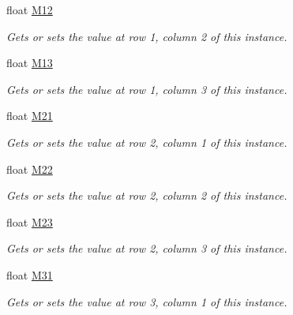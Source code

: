 \begin{DoxyCompactItemize}
float \hyperlink{struct_open_t_k_1_1_matrix3_ad1f2cc65b1e98182526cfbe1dc9e5894}{M12}
\begin{DoxyCompactList}\small\item\em Gets or sets the value at row 1, column 2 of this instance. \end{DoxyCompactList}\item 
float \hyperlink{struct_open_t_k_1_1_matrix3_a99492f310f33c5f5958d43b9df9fb245}{M13}
\begin{DoxyCompactList}\small\item\em Gets or sets the value at row 1, column 3 of this instance. \end{DoxyCompactList}\item 
float \hyperlink{struct_open_t_k_1_1_matrix3_a510334b289982d887bdff7bdda6ccd47}{M21}
\begin{DoxyCompactList}\small\item\em Gets or sets the value at row 2, column 1 of this instance. \end{DoxyCompactList}\item 
float \hyperlink{struct_open_t_k_1_1_matrix3_ac60318d4f1db6d22d807f51a96b8cb7e}{M22}
\begin{DoxyCompactList}\small\item\em Gets or sets the value at row 2, column 2 of this instance. \end{DoxyCompactList}\item 
float \hyperlink{struct_open_t_k_1_1_matrix3_a1f59f2bc24469a9714f10531ed0e2b47}{M23}
\begin{DoxyCompactList}\small\item\em Gets or sets the value at row 2, column 3 of this instance. \end{DoxyCompactList}\item 
float \hyperlink{struct_open_t_k_1_1_matrix3_a7f6c3c79262649a0091429fcd03b6ec6}{M31}
\begin{DoxyCompactList}\small\item\em Gets or sets the value at row 3, column 1 of this instance. \end{DoxyCompactList}\item 

\end{DoxyCompactItemize}
